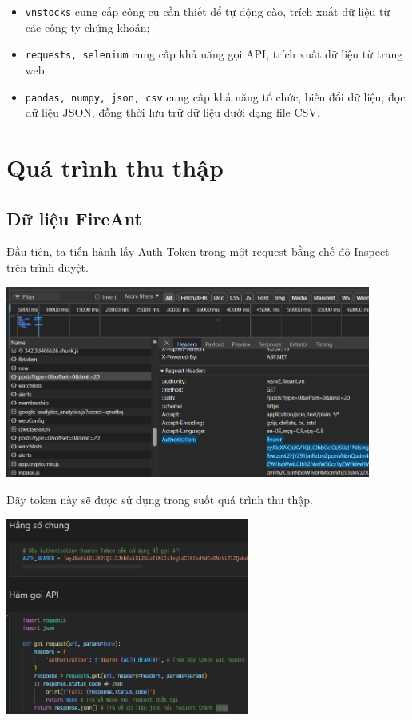 \begin{itemize}
    \item \texttt{vnstocks} cung cấp công cụ cần thiết để tự động cào, trích xuất dữ liệu từ các công ty chứng khoán;
    \item \texttt{requests, selenium} cung cấp khả năng gọi API, trích xuất dữ liệu từ trang web;
    \item \texttt{pandas, numpy, json, csv} cung cấp khả năng tổ chức, biến đổi dữ liệu, đọc dữ liệu JSON, đồng thời lưu trữ dữ liệu dưới dạng file CSV.
\end{itemize}

\section{Quá trình thu thập}
\subsection{Dữ liệu FireAnt}
Đầu tiên, ta tiến hành lấy Auth Token trong một request bằng chế độ Inspect trên trình duyệt.
\begin{center}
\includegraphics[width=0.9\textwidth]{images/code-1.1-inspect.png}
\end{center}

Dãy token này sẽ được sử dụng trong suốt quá trình thu thập.\\
\begin{center}
\includegraphics[width=0.6\textwidth]{images/code-1.2-getrequest.png}
\end{center}

